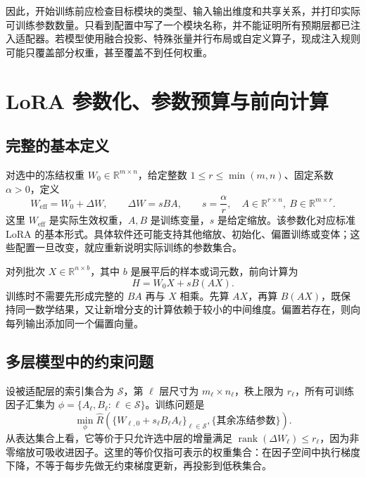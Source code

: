 \documentclass[UTF8,12pt,a4paper,fontset=fandol]{ctexart}
\begin{document}
因此，开始训练前应检查目标模块的类型、输入输出维度和共享关系，并打印实际可训练参数数量。只看到配置中写了一个模块名称，并不能证明所有预期层都已注入适配器。若模型使用融合投影、特殊张量并行布局或自定义算子，现成注入规则可能只覆盖部分权重，甚至覆盖不到任何权重。

\section{LoRA 参数化、参数预算与前向计算}
\label{sec:lora-definition}

\subsection{完整的基本定义}

对选中的冻结权重 $W_0\in\mathbb R^{m\times n}$，给定整数
$1\leq r\leq\min(m,n)$、固定系数 $\alpha>0$，定义
\begin{equation}
W_{\mathrm{eff}}=W_0+\Delta W,\qquad
\Delta W=sBA,\qquad
s=\frac{\alpha}{r},
\quad A\in\mathbb R^{r\times n},\ B\in\mathbb R^{m\times r}.
\label{eq:lora}
\end{equation}
这里 $W_{\mathrm{eff}}$ 是实际生效权重，$A,B$ 是训练变量，$s$ 是给定缩放。该参数化对应标准 LoRA 的基本形式\cite{hu2021}。具体软件还可能支持其他缩放、初始化、偏置训练或变体；这些配置一旦改变，就应重新说明实际训练的参数集合。

对列批次 $X\in\mathbb R^{n\times b}$，其中 $b$ 是展平后的样本或词元数，前向计算为
\begin{equation}
H=W_0X+sB(AX).
\label{eq:lora-forward}
\end{equation}
训练时不需要先形成完整的 $BA$ 再与 $X$ 相乘。先算 $AX$，再算 $B(AX)$，既保持同一数学结果，又让新增分支的计算依赖于较小的中间维度。偏置若存在，则向每列输出添加同一个偏置向量。

\subsection{多层模型中的约束问题}

设被适配层的索引集合为 $\mathcal S$，第 $\ell$ 层尺寸为
$m_\ell\times n_\ell$，秩上限为 $r_\ell$，所有可训练因子汇集为
$\phi=\{A_\ell,B_\ell:\ell\in\mathcal S\}$。训练问题是
\[
\min_{\phi}\widehat R\left(
\{W_{\ell,0}+s_\ell B_\ell A_\ell\}_{\ell\in\mathcal S},
\{\text{其余冻结参数}\}\right).
\]
从表达集合上看，它等价于只允许选中层的增量满足
$\operatorname{rank}(\Delta W_\ell)\leq r_\ell$，因为非零缩放可吸收进因子。这里的等价仅指可表示的权重集合：在因子空间中执行梯度下降，不等于每步先做无约束梯度更新，再投影到低秩集合。
\end{document}
